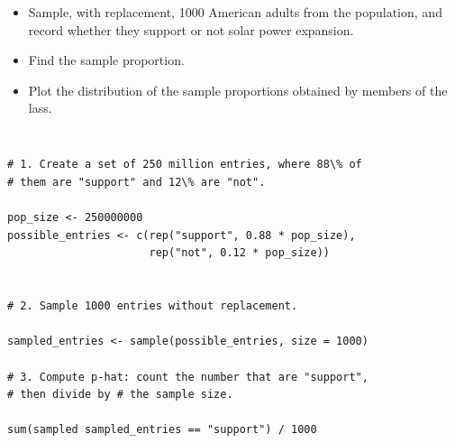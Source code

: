 \begin{frame}
\frametitle{}


\begin{itemize}

\item Sample, with replacement, 1000 American adults from the population, and record whether they support or not solar power expansion.

\item Find the sample proportion.

\item Plot the distribution of the sample proportions obtained by members of the lass.

\end{itemize}

\end{frame}


\begin{frame}[fragile]
\frametitle{}

\begin{beamerboxesrounded}[shadow = true, lower = code body]{}
{
\small 
\begin{verbatim}

# 1. Create a set of 250 million entries, where 88\% of 
# them are "support" and 12\% are "not".

pop_size <- 250000000
possible_entries <- c(rep("support", 0.88 * pop_size), 
                      rep("not", 0.12 * pop_size))


# 2. Sample 1000 entries without replacement.

sampled_entries <- sample(possible_entries, size = 1000)

# 3. Compute p-hat: count the number that are "support", 
# then divide by # the sample size.

sum(sampled sampled_entries == "support") / 1000

\end{verbatim}
}
\end{beamerboxesrounded}

\end{frame}

